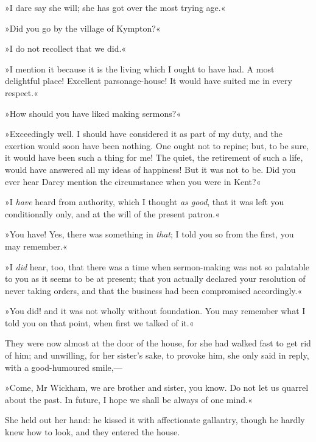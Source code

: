 »I dare say she will; she has got over the most trying age.«

»Did you go by the village of Kympton?«

»I do not recollect that we did.«

»I mention it because it is the living which I ought to have had. A most delightful place! Excellent parsonage-house! It would have suited me in every respect.«

»How should you have liked making sermons?«

»Exceedingly well. I should have considered it as part of my duty, and the exertion would soon have been nothing. One ought not to repine; but, to be sure, it would have been such a thing for me! The quiet, the retirement of such a life, would have answered all my ideas of happiness! But it was not to be. Did you ever hear Darcy mention the circumstance when you were in Kent?«

»I \textit{have} heard from authority, which I thought \textit{as good}, that it was left you conditionally only, and at the will of the present patron.«

»You have! Yes, there was something in \textit{that}; I told you so from the first, you may remember.«

»I \textit{did} hear, too, that there was a time when sermon-making was not so palatable to you as it seems to be at present; that you actually declared your resolution of never taking orders, and that the business had been compromised accordingly.«

»You did! and it was not wholly without foundation. You may remember what I told you on that point, when first we talked of it.«

They were now almost at the door of the house, for she had walked fast to get rid of him; and unwilling, for her sister's sake, to provoke him, she only said in reply, with a good-humoured smile,—

»Come, Mr Wickham, we are brother and sister, you know. Do not let us quarrel about the past. In future, I hope we shall be always of one mind.«

She held out her hand: he kissed it with affectionate gallantry, though he hardly knew how to look, and they entered the house.